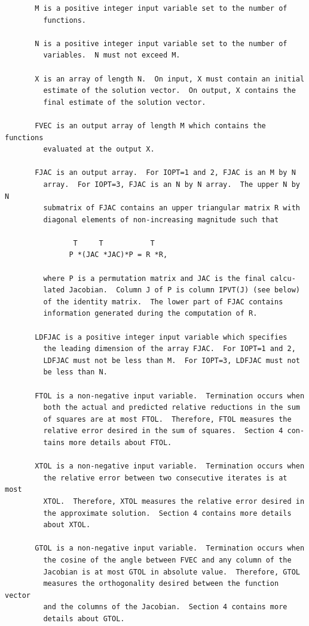 \documentclass[11pt,twoside]{article}
\begin{document}
\begin{verbatim}
       M is a positive integer input variable set to the number of
         functions.

       N is a positive integer input variable set to the number of
         variables.  N must not exceed M.

       X is an array of length N.  On input, X must contain an initial
         estimate of the solution vector.  On output, X contains the
         final estimate of the solution vector.

       FVEC is an output array of length M which contains the functions
         evaluated at the output X.

       FJAC is an output array.  For IOPT=1 and 2, FJAC is an M by N
         array.  For IOPT=3, FJAC is an N by N array.  The upper N by N
         submatrix of FJAC contains an upper triangular matrix R with
         diagonal elements of non-increasing magnitude such that

                T     T           T
               P *(JAC *JAC)*P = R *R,

         where P is a permutation matrix and JAC is the final calcu-
         lated Jacobian.  Column J of P is column IPVT(J) (see below)
         of the identity matrix.  The lower part of FJAC contains
         information generated during the computation of R.

       LDFJAC is a positive integer input variable which specifies
         the leading dimension of the array FJAC.  For IOPT=1 and 2,
         LDFJAC must not be less than M.  For IOPT=3, LDFJAC must not
         be less than N.

       FTOL is a non-negative input variable.  Termination occurs when
         both the actual and predicted relative reductions in the sum
         of squares are at most FTOL.  Therefore, FTOL measures the
         relative error desired in the sum of squares.  Section 4 con-
         tains more details about FTOL.

       XTOL is a non-negative input variable.  Termination occurs when
         the relative error between two consecutive iterates is at most
         XTOL.  Therefore, XTOL measures the relative error desired in
         the approximate solution.  Section 4 contains more details
         about XTOL.

       GTOL is a non-negative input variable.  Termination occurs when
         the cosine of the angle between FVEC and any column of the
         Jacobian is at most GTOL in absolute value.  Therefore, GTOL
         measures the orthogonality desired between the function vector
         and the columns of the Jacobian.  Section 4 contains more
         details about GTOL.


\end{verbatim}
\end{document}
